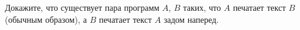 Докажите, что существует пара программ $A$, $B$ таких, что $A$ печатает текст $B$ (обычным образом), а $B$ печатает текст $A$
задом наперед.